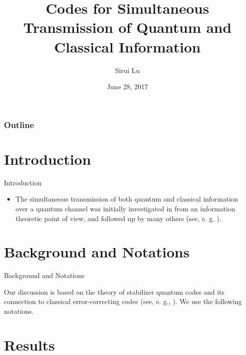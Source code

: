 \documentclass[ignorenonframetext,]{beamer}
\title{Codes for Simultaneous Transmission of Quantum and Classical Information}
\author{Sirui Lu}
\institute{ISIT 2017}
\date{June 28, 2017}
\providecommand{\tightlist}{%
  \setlength{\itemsep}{0pt}\setlength{\parskip}{0pt}}
\begin{document}
\frame{\titlepage}

\begin{frame}
\frametitle{Outline} %
\tableofcontents%
\end{frame}

\section{Introduction}\label{introduction}

\begin{frame}{Introduction}

\begin{itemize}
\tightlist
\item
  The simultaneous transmission of both quantum and classical
  information over a quantum channel was initially investigated in
  \citeyearpar{DeSh05} from an information theoretic point of view, and
  followed up by many others (see, e. g.
  \citeyearpar[\citet{hsieh2010entanglement},
  \citet{hsieh2010trading}]{yard2005simultaneous}).
\end{itemize}

\end{frame}

\section{Background and Notations}\label{background-and-notations}

\begin{frame}{Background and Notations}

Our discussion is based on the theory of stabilizer quantum codes and
its connection to classical error-correcting codes (see, e. g.,
\citet{CRSS98}). We use the following notations.

\end{frame}

\section{Results}\label{results}
\end{document}
